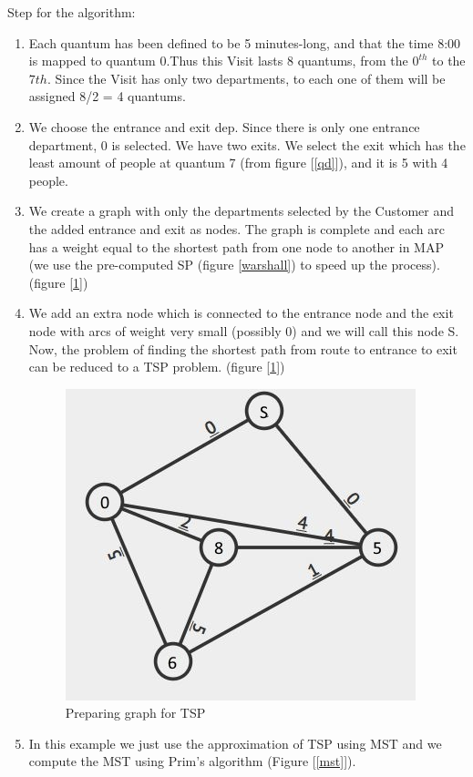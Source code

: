 \documentclass[a4paper, 12pt, oneside, table]{article}
\begin{document}
Step for the algorithm:
\begin{enumerate}
    \item Each quantum has been defined to be 5 minutes-long, and that the time 8:00 is mapped to quantum 0.Thus this Visit lasts 8 quantums, from the $0^{th}$ to the $7th$. Since the Visit has only two departments, to each one of them will be assigned 8/2 = 4 quantums.
    \item We choose the entrance and exit dep. Since there is only one entrance department, 0 is selected. We have two exits. We select the exit which has the least amount of people at quantum 7 (from figure [\ref{qd}]), and it is 5 with 4 people.
    \item We create a graph with only the departments selected by the Customer and the added entrance and exit as nodes. The graph is complete and each arc has a weight equal to the shortest path from one node to another in MAP (we use the pre-computed SP (figure \ref{warshall}) to speed up the process). (figure [\ref{graphForTSP}])
    \item We add an extra node which is connected to the entrance node and the exit node with arcs of weight very small (possibly 0) and we will call this node S. Now, the problem of finding the shortest path from route to entrance to exit can be reduced to a TSP problem. (figure [\ref{graphForTSP}])
    \begin{figure}[H]
    \centering
    	\centering
      	\includegraphics[height=0.4\textheight, scale=0.2, keepaspectratio]{img/alg_map_man/graph_for_tsp2.JPG}
    	\caption{Preparing graph for TSP}
     	\label{graphForTSP}
    \end{figure}
    \item In this example we just use the approximation of TSP using MST and we compute the MST using Prim's algorithm (Figure [\ref{mst}]).\newline

\end{enumerate}
\end{document}
